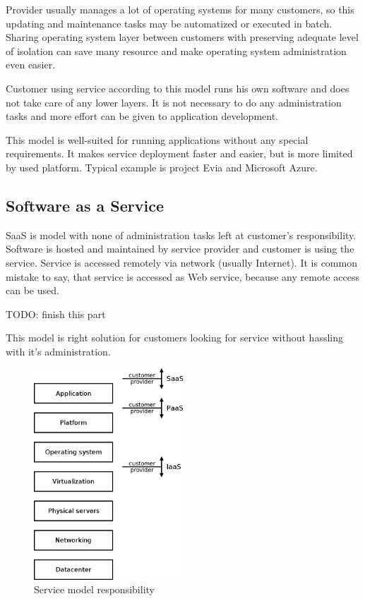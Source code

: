 Provider usually manages a lot of operating systems for many customers, so  this updating and maintenance tasks may be automatized or executed in batch. Sharing operating system layer between customers with preserving adequate level of isolation can save many resource and make operating system administration even easier.

Customer using service according to this model runs his own software and does not take care of any lower layers. It is not necessary to do any administration tasks and more effort can be given to application development. 

This model is well-suited for running applications without any special requirements. It makes service deployment faster and easier, but is more limited by used platform. 
Typical example is project Evia and Microsoft Azure.

\subsection{Software as a Service}
\Ac{SaaS} is model with none of administration tasks left at customer's responsibility. Software is hosted and maintained by service provider and customer is using the service. Service is accessed remotely via network (usually Internet). It is common mistake to say, that service is accessed as Web service, because any remote access can be used. 

TODO: finish this part

This model is right solution for customers looking for service without hassling with it's administration.

\begin{figure}[htb]
	\begin{center}
	\includegraphics[width=0.5\textwidth]{service-models.png}
	\end{center}
	\caption{Service model responsibility}
	\label{img:service-models}
\end{figure}

